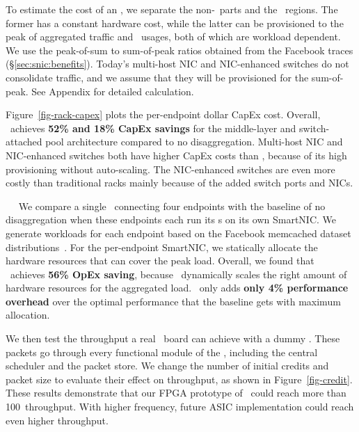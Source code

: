 To estimate the cost of an \snic, we separate the non-\nt\ parts and the \nt\ regions. The former has a constant hardware cost, while the latter can be provisioned to the peak of aggregated traffic and \nt\ usages, both of which are workload dependent. We use the peak-of-sum to sum-of-peak ratios obtained from the Facebook traces (\S\ref{sec:snic:benefits}). Today's multi-host NIC and NIC-enhanced switches do not consolidate traffic, and we assume that they will be provisioned for the sum-of-peak. See Appendix for detailed calculation. 

Figure~\ref{fig-rack-capex} plots the per-endpoint dollar CapEx cost. Overall, \snic\ achieves \textbf{52\% and 18\% CapEx savings} for the middle-layer and switch-attached pool architecture compared to no disaggregation.
Multi-host NIC and NIC-enhanced switches both have higher CapEx costs than \snic, because of its high provisioning without auto-scaling. The NIC-enhanced switches are even more costly than traditional racks mainly because of the added switch ports and NICs.

~~
We compare a single \snic\ connecting four endpoints with the baseline of no disaggregation when these endpoints each run its \nt{}s on its own SmartNIC.
We generate workloads for each endpoint based on the Facebook memcached dataset distributions~\cite{Atikoglu12-SIGMETRICS}.
For the per-endpoint SmartNIC, we statically allocate the hardware resources that can cover the peak load.
Overall, we found that \snic\ achieves \textbf{56\% OpEx saving}, because \snic\ dynamically scales the right amount of hardware resources for the aggregated load.
\snic\ only adds \textbf{only 4\% performance overhead} over the optimal performance that the baseline gets with maximum allocation.

We then test the throughput a real \snic\ board can achieve with a dummy \nt.
These packets go through every functional module of the \snic, including the central scheduler and the packet store. 
We change the number of initial credits and packet size to evaluate their effect on throughput, as shown in Figure~\ref{fig-credit}.
These results demonstrate that our FPGA prototype of \snic\ could reach more than 100\Gbps\ throughput. 
With higher frequency, future ASIC implementation could reach even higher throughput.


